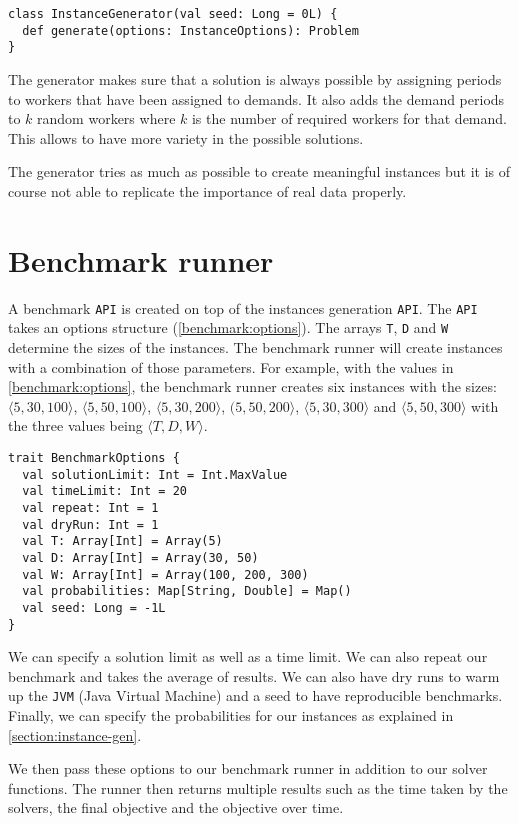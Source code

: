 \documentclass[../thesis.tex]{subfiles}
\begin{document}
  
\begin{lstlisting}[style=scalaStyle,caption={Instance generator \texttt{API}},captionpos=b]
class InstanceGenerator(val seed: Long = 0L) {
  def generate(options: InstanceOptions): Problem
}
\end{lstlisting}

The generator makes sure that a solution is always possible by assigning periods to workers 
that have been assigned to demands. It also adds the demand periods to $k$ random workers
where $k$ is the number of required workers for that demand. 
This allows to have more variety in the possible solutions.
    
The generator tries as much as possible to create meaningful instances but it is of course not able to replicate the importance of real data properly.

\section{Benchmark runner}
\label{section:benchmark-runner}

A benchmark \texttt{API} is created on top of the instances generation \texttt{API}. The \texttt{API} takes an options structure (\autoref{benchmark:options}).
The arrays \texttt{T}, \texttt{D} and \texttt{W} determine the sizes of the instances. The benchmark runner 
will create instances with a combination of those parameters. For example, with the values in \autoref{benchmark:options},
the benchmark runner creates six instances with the sizes: $\langle5, 30, 100\rangle$, $\langle5, 50, 100\rangle$, $\langle5, 30, 200\rangle$, $(5, 50, 200\rangle$, $\langle5, 30, 300\rangle$ and $\langle5, 50, 300\rangle$ with the 
three values being $\langle T, D, W\rangle$.

\begin{lstlisting}[style=scalaStyle,label={benchmark:options},caption={Benchmark options},captionpos=b]
trait BenchmarkOptions {
  val solutionLimit: Int = Int.MaxValue
  val timeLimit: Int = 20
  val repeat: Int = 1
  val dryRun: Int = 1
  val T: Array[Int] = Array(5)
  val D: Array[Int] = Array(30, 50)
  val W: Array[Int] = Array(100, 200, 300)
  val probabilities: Map[String, Double] = Map()
  val seed: Long = -1L
}
\end{lstlisting}

We can specify a solution limit as well as a time limit. We can also repeat our benchmark and takes 
the average of results. We can also have dry runs to warm up the \texttt{JVM} (Java Virtual Machine) and a seed to have reproducible benchmarks. Finally,
we can specify the probabilities for our instances as explained in \autoref{section:instance-gen}.

We then pass these options to our benchmark runner in addition to our solver functions. The runner then returns 
multiple results such as the time taken by the solvers, the final objective and the objective over time.
\end{document}
